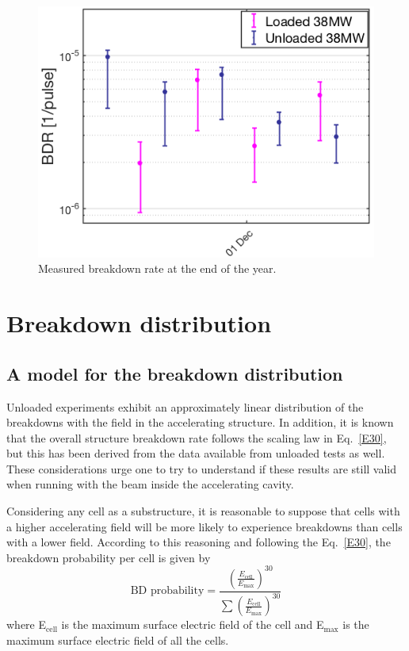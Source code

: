 \begin{figure}[h]
\centering 
\includegraphics[scale=0.52]{pictures/BDR_last_part_year.png}
\caption{Measured breakdown rate at the end of the year.}
\label{BD_prob_last_raise}
\end{figure}





\section[Breakdown distribution]{Breakdown distribution}

\subsection[A model for the breakdown distribution]{A model for the breakdown distribution}

Unloaded experiments exhibit an approximately linear distribution of the breakdowns with the field in the accelerating structure. In addition, it is known that the overall structure breakdown rate follows the scaling law in Eq.~\ref{E30}, but this has been derived from the data available from unloaded tests as well. These considerations urge one to try to understand if these results are still valid when running with the beam inside the accelerating cavity.

Considering any cell as a substructure, it is reasonable to suppose that cells with a higher accelerating field will be more likely to experience breakdowns than cells with a lower field. According to this reasoning and following the Eq.~\ref{E30}, the breakdown probability per cell is given by
\begin{equation}
\text{BD probability} =\frac{   \left ( \frac{E_\text{cell}}{E_\text{max}} \right )^{30} }{ \sum \left( \frac{E_\text{cell}}{E_\text{max}} \right )^{30}   } 
\label{scal_eq_prob}
\end{equation}
where E$_\text{cell}$ is the maximum surface electric field of the cell and E$_\text{max}$ is the maximum surface electric field of all the cells. 

